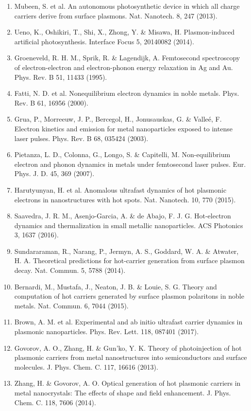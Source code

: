 \documentclass[10pt]{article}
\begin{document}
\begin{enumerate}
  \item Mubeen, S. et al. An autonomous photosynthetic device in which all charge carriers derive from surface plasmons. Nat. Nanotech. 8, 247 (2013).
  \item Ueno, K., Oshikiri, T., Shi, X., Zhong, Y. \& Misawa, H. Plasmon-induced artificial photosynthesis. Interface Focus 5, 20140082 (2014).
  \item Groeneveld, R. H. M., Sprik, R. \& Lagendijk, A. Femtosecond spectroscopy of electron-electron and electron-phonon energy relaxation in Ag and Au. Phys. Rev. B 51, 11433 (1995).
  \item Fatti, N. D. et al. Nonequilibrium electron dynamics in noble metals. Phys. Rev. B 61, 16956 (2000).
  \item Grua, P., Morreeuw, J. P., Bercegol, H., Jonusauskas, G. \& Valleé, F. Electron kinetics and emission for metal nanoparticles exposed to intense laser pulses. Phys. Rev. B 68, 035424 (2003).
  \item Pietanza, L. D., Colonna, G., Longo, S. \& Capitelli, M. Non-equilibrium electron and phonon dynamics in metals under femtosecond laser pulses. Eur. Phys. J. D. 45, 369 (2007).
  \item Harutyunyan, H. et al. Anomalous ultrafast dynamics of hot plasmonic electrons in nanostructures with hot spots. Nat. Nanotech. 10, 770 (2015).
  \item Saavedra, J. R. M., Asenjo-Garcia, A. \& de Abajo, F. J. G. Hot-electron dynamics and thermalization in small metallic nanoparticles. ACS Photonics 3, 1637 (2016).
  \item Sundararaman, R., Narang, P., Jermyn, A. S., Goddard, W. A. \& Atwater, H. A. Theoretical predictions for hot-carrier generation from surface plasmon decay. Nat. Commun. 5, 5788 (2014).
  \item Bernardi, M., Mustafa, J., Neaton, J. B. \& Louie, S. G. Theory and computation of hot carriers generated by surface plasmon polaritons in noble metals. Nat. Commun. 6, 7044 (2015).
  \item Brown, A. M. et al. Experimental and ab initio ultrafast carrier dynamics in plasmonic nanoparticles. Phys. Rev. Lett. 118, 087401 (2017).
  \item Govorov, A. O., Zhang, H. \& Gun'ko, Y. K. Theory of photoinjection of hot plasmonic carriers from metal nanostructures into semiconductors and surface molecules. J. Phys. Chem. C. 117, 16616 (2013).
  \item Zhang, H. \& Govorov, A. O. Optical generation of hot plasmonic carriers in metal nanocrystals: The effects of shape and field enhancement. J. Phys. Chem. C. 118, 7606 (2014).

\end{enumerate}
\end{document}
